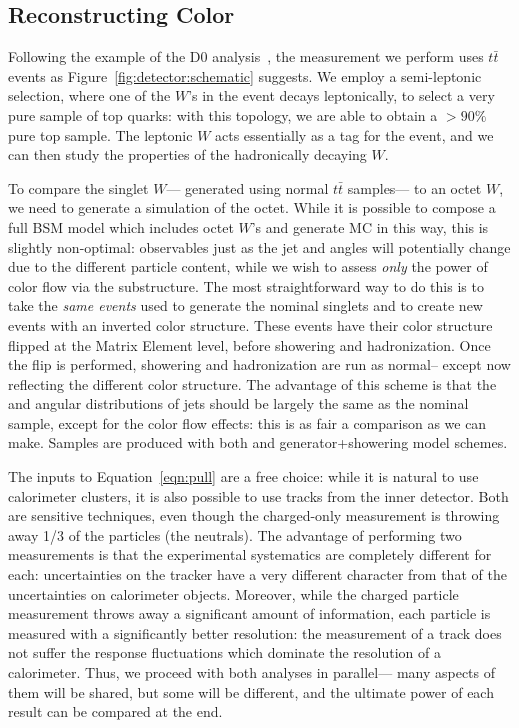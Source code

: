 \subsection{Reconstructing Color}

Following the example of the D0 analysis~\cite{Abazov:2011vh}, the measurement we perform uses $t\bar{t}$ events as Figure~\ref{fig:detector:schematic} suggests. We employ a semi-leptonic selection, where one of the $W$'s in the event decays leptonically, to select a very pure sample of top quarks: with this topology, we are able to obtain a $>90\%$ pure top sample. The leptonic $W$ acts essentially as a tag for the event, and we can then study the properties of the hadronically decaying $W$.

To compare the singlet $W$--- generated using normal \PowPythia $t\bar{t}$ samples--- to an octet $W$, we need to generate a simulation of the octet. While it is possible to compose a full BSM model which includes octet $W$'s and generate MC in this way, this is slightly non-optimal: observables just as the jet \pt and angles will potentially change due to the different particle content, while we wish to assess \textit{only} the power of color flow via the substructure. The most straightforward way to do this is to take the \textit{same events} used to generate the nominal singlets and to create new events with an inverted color structure. These events have their color structure flipped at the Matrix Element level, before showering and hadronization. Once the flip is performed, showering and hadronization are run as normal-- except now reflecting the different color structure. The advantage of this scheme is that the \pt and angular distributions of jets should be largely the same as the nominal sample, except for the color flow effects: this is as fair a comparison as we can make. Samples are produced with both \PowPythia and \PowHerwig generator+showering model schemes. 


The inputs to Equation~\ref{eqn:pull} are a free choice: while it is natural to use calorimeter clusters, it is also possible to use tracks from the inner detector. Both are sensitive techniques, even though the charged-only measurement is throwing away 1/3 of the particles (the neutrals). The advantage of performing two measurements is that the experimental systematics are completely different for each: uncertainties on the tracker have a very different character from that of the uncertainties on calorimeter objects. Moreover, while the charged particle measurement throws away a significant amount of information, each particle is measured with a significantly better resolution: the \pt measurement of a track does not suffer the response fluctuations which dominate the resolution of a calorimeter. Thus, we proceed with both analyses in parallel--- many aspects of them will be shared, but some will be different, and the ultimate power of each result can be compared at the end.



